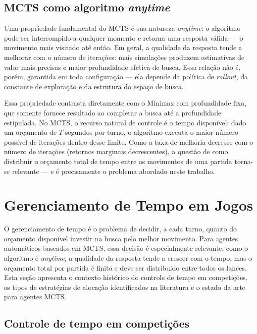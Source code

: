 \documentclass[cic,tc]{iiufrgs}
\begin{document}
\subsection{MCTS como algoritmo \emph{anytime}}
\label{sec:mcts_anytime}

Uma propriedade fundamental do MCTS é sua natureza \emph{anytime}: o algoritmo pode ser interrompido a qualquer momento e retorna uma resposta válida — o movimento mais visitado até então. Em geral, a qualidade da resposta tende a melhorar com o número de iterações: mais simulações produzem estimativas de valor mais precisas e maior profundidade efetiva de busca. Essa relação não é, porém, garantida em toda configuração — ela depende da política de \emph{rollout}, da constante de exploração e da estrutura do espaço de busca.

Essa propriedade contrasta diretamente com o Minimax com profundidade fixa, que somente fornece resultado ao completar a busca até a profundidade estipulada. No MCTS, o recurso natural de controle é o tempo disponível: dado um orçamento de $T$ segundos por turno, o algoritmo executa o maior número possível de iterações dentro desse limite. Como a taxa de melhoria decresce com o número de iterações (retornos marginais decrescentes), a questão de como distribuir o orçamento total de tempo entre os movimentos de uma partida torna-se relevante — e é precisamente o problema abordado neste trabalho.

\section{Gerenciamento de Tempo em Jogos}
\label{sec:timemanagement}

O gerenciamento de tempo é o problema de decidir, a cada turno, quanto do orçamento disponível investir na busca pelo melhor movimento. Para agentes automáticos baseados em MCTS, essa decisão é especialmente relevante: como o algoritmo é \emph{anytime}, a qualidade da resposta tende a crescer com o tempo, mas o orçamento total por partida é finito e deve ser distribuído entre todos os lances. Esta seção apresenta o contexto histórico do controle de tempo em competições, os tipos de estratégias de alocação identificados na literatura e o estado da arte para agentes MCTS.

\subsection{Controle de tempo em competições}
\label{sec:timecontrol_history}
\end{document}
